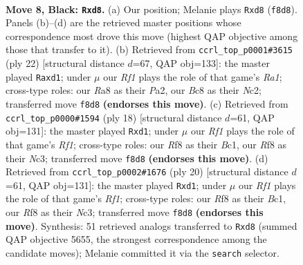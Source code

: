 \documentclass[11pt]{article}
\begin{document}
\begin{figure}[p]\centering
\begin{subfigure}{0.46\textwidth}\centering
\resizebox{\linewidth}{!}{%
\newchessgame
\chessboard[
  setfen={rnbQ1rk1/ppp2pbp/5np1/4p3/2P1P3/2N2N2/PP2BPPP/R1B1K2R b KQ - 0 8},
  showmover=false,
  pgfstyle=straightmove, color=movearrow, markmove={f8-d8}
]}
\caption{}
\end{subfigure}\hfill
\begin{subfigure}{0.46\textwidth}\centering
\resizebox{\linewidth}{!}{%
\newchessgame
\chessboard[
  setfen={r1b2rk1/pp2ppbp/2np1np1/8/2P1P3/2N3P1/PPNB1PBP/R2q1RK1 w - - 0 12},
  showmover=false,
  pgfstyle=straightmove, color=movearrow, markmove={a1-d1}
]}
\caption{}
\end{subfigure}
\\[4pt]
\begin{subfigure}{0.46\textwidth}\centering
\resizebox{\linewidth}{!}{%
\newchessgame
\chessboard[
  setfen={r1b1k2r/1p2bppp/p1n1pn2/2P5/P1B5/2N1PN2/1P3PPP/R1Bq1RK1 w kq - 0 10},
  showmover=false,
  pgfstyle=straightmove, color=movearrow, markmove={f1-d1}
]}
\caption{}
\end{subfigure}\hfill
\begin{subfigure}{0.46\textwidth}\centering
\resizebox{\linewidth}{!}{%
\newchessgame
\chessboard[
  setfen={r1b1k2r/1p2bppp/p1n1pn2/2P5/P1B5/2N1PN2/1P3PPP/R1Bq1RK1 w kq - 0 11},
  showmover=false,
  pgfstyle=straightmove, color=movearrow, markmove={f1-d1}
]}
\caption{}
\end{subfigure}
\caption{\textbf{Move 8, Black: \texttt{Rxd8}.} (a) Our position; Melanie plays \texttt{Rxd8} (\texttt{f8d8}). Panels (b)--(d) are the retrieved master positions whose correspondence most drove this move (highest QAP objective among those that transfer to it). (b) Retrieved from \texttt{ccrl\_top\_p0001\#3615} (ply 22) [structural distance $d$=67, QAP obj=133]: the master played \texttt{Raxd1}; under $\mu$ our \emph{Rf1} plays the role of that game's \emph{Ra1}; cross-type roles: our \emph{R}a8 as their \emph{P}a2, our \emph{B}c8 as their \emph{N}c2; transferred move \texttt{f8d8} \textbf{(endorses this move)}. (c) Retrieved from \texttt{ccrl\_top\_p0000\#1594} (ply 18) [structural distance $d$=61, QAP obj=131]: the master played \texttt{Rxd1}; under $\mu$ our \emph{Rf1} plays the role of that game's \emph{Rf1}; cross-type roles: our \emph{R}f8 as their \emph{B}c1, our \emph{R}f8 as their \emph{N}c3; transferred move \texttt{f8d8} \textbf{(endorses this move)}. (d) Retrieved from \texttt{ccrl\_top\_p0002\#1676} (ply 20) [structural distance $d$=61, QAP obj=131]: the master played \texttt{Rxd1}; under $\mu$ our \emph{Rf1} plays the role of that game's \emph{Rf1}; cross-type roles: our \emph{R}f8 as their \emph{B}c1, our \emph{R}f8 as their \emph{N}c3; transferred move \texttt{f8d8} \textbf{(endorses this move)}. Synthesis: 51 retrieved analogs transferred to \texttt{Rxd8} (summed QAP objective 5655, the strongest correspondence among the candidate moves); Melanie committed it via the \texttt{search} selector.}
\label{fig:thought-m15}
\end{figure}
\end{document}
